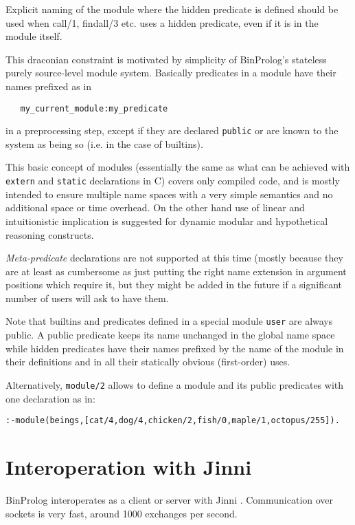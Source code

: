 \documentclass{article}
\begin{document}
Explicit naming of the module where the hidden predicate
is defined should be used when call/1, findall/3 etc. uses
a hidden predicate, even if it is in the module itself.

This draconian constraint is motivated by simplicity of
BinProlog's stateless purely source-level module system.
Basically predicates in a module have their names prefixed
as in
\begin{verbatim}
   my_current_module:my_predicate
\end{verbatim}
in a preprocessing
step, except if they are declared {\tt public} or are known to
the system as being so (i.e. in the case of builtins).

This basic concept of modules (essentially the same as
what can be achieved with {\tt extern} and {\tt static}
declarations in C) covers only compiled code,
and is mostly intended to ensure
multiple name spaces with a very simple semantics
and no additional space or time overhead. On the other
hand use of linear and intuitionistic implication
is suggested for dynamic modular and hypothetical reasoning
constructs.

{\em Meta-predicate} declarations are not supported at this time (mostly
because they are at least as cumbersome as just putting the right
name extension in argument positions which require it, but they
might be added in the future if a significant number of
users will ask to have them.

Note that builtins and predicates defined in a special module {\tt user}
are always public. A public predicate keeps its name unchanged
in the global name space while hidden predicates have their
names prefixed by the name of the module in their
definitions and in all their statically obvious (first-order)
uses.

Alternatively, {\tt module/2} allows to define a module and its
public predicates with one declaration as in:

\begin{verbatim}
:-module(beings,[cat/4,dog/4,chicken/2,fish/0,maple/1,octopus/255]).
\end{verbatim}

\section{Interoperation with Jinni}

BinProlog interoperates as a client or server with Jinni . Communication over
sockets is very fast, around 1000 exchanges per second.
\end{document}
